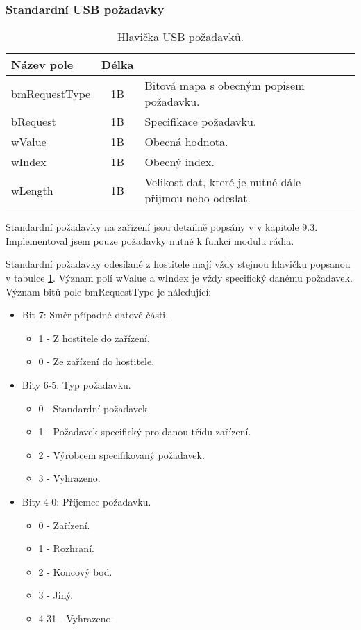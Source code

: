 \subsubsection{Standardní USB požadavky}

\begin{table}[ht!]
\begin{center}
\begin{tabular}{|l|c|l|l|}
\hline 
Název pole & Délka &  \\ 
\hline
bmRequestType & 1B & Bitová mapa s obecným popisem požadavku.\\
\hline
bRequest & 1B & Specifikace požadavku. \\
\hline
wValue & 1B & Obecná hodnota. \\
\hline
wIndex & 1B & Obecný index.\\
\hline
wLength & 1B & Velikost dat, které je nutné dále přijmou nebo odeslat. \\ 
\hline
\end{tabular} 
\end{center}
\caption{Hlavička USB požadavků.}
\label{tab:usb-stdreq-hdr} 
\end{table}

Standardní požadavky na zařízení jsou detailně popsány v \cite{usb-spec} v kapitole 9.3. Implementoval jsem pouze požadavky nutné k funkci modulu rádia.

Standardní požadavky odesílané z hostitele mají vždy stejnou hlavičku popsanou v tabulce \ref{tab:usb-stdreq-hdr}. Význam polí wValue a wIndex je vždy specifický danému požadavek. Význam bitů pole bmRequestType je náledující:

\begin{itemize}
\item Bit 7: Směr případné datové části.
	\begin{itemize}
	\item 1 - Z hostitele do zařízení, 
	\item 0 - Ze zařízení do hostitele.
	\end{itemize}
	
\item Bity 6-5: Typ požadavku.
	\begin{itemize}
	\item 0 - Standardní požadavek.
	\item 1 - Požadavek specifický pro danou třídu zařízení.
	\item 2 - Výrobcem specifikovaný požadavek.
	\item 3 - Vyhrazeno.
	\end{itemize}
	
\item Bity 4-0: Příjemce požadavku.
	\begin{itemize}
	\item 0 - Zařízení.
	\item 1 - Rozhraní.
	\item 2 - Koncový bod.
	\item 3 - Jiný.
	\item 4-31 - Vyhrazeno.
	\end{itemize}
	
\end{itemize}

